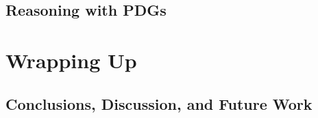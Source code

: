\documentclass[tocprelim,
    ]{cornellmodified}
\newif\iffoundations\foundationsfalse
\begin{document}
\chapter{Reasoning with PDGs}
    


\iffoundations
\part{Foundations} \label{part:foundations}

\chapter{Learner's Confidence}
    

\chapter{Relative Entropy Soup}
    

\chapter{The Category Theory of PDGs}
    
\fi

\part{Wrapping Up}  \label{part:conclusions}
\chapter{Conclusions, Discussion, and Future Work}
    \label{chap:end}
    


% 
% 

\end{document}
